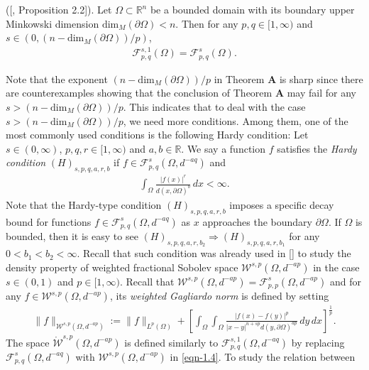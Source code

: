 \documentclass[11pt,twoside]{article}
\def\rr{{\mathbb R}}
\def\boz{{\Omega}}
\def\pa{\partial}                %
\theoremstyle{mylem}
\theoremstyle{definition}
\numberwithin{equation}{section}
\begin{document}
\medskip
{ ([\cite{c2000}, Proposition 2.2]).   Let \(\Omega\subset\mathbb{R}^n\) be a bounded domain 
with  its boundary upper Minkowski dimension $\mathrm{dim}_M(\partial\Omega)<n$. Then for any $ p,q\in[1,\infty)$ and $s\in (0,
{(n-\mathrm{dim}_M(\partial\Omega))}/{p})$,
\begin{align*}
\mathcal F_{p,q}^{s,1}(\boz)={\mathcal F}_{p,q}^{s}(\boz).
\end{align*}
}

Note that the exponent ${(n-\mathrm{dim}_M(\partial\Omega))}/{p}$ in Theorem {\bf A}
is sharp since there are counterexamples showing that 
the conclusion of Theorem {\bf A} may fail 
for any $s>{(n-\mathrm{dim}_M(\partial\Omega))}/{p}$. This indicates that to deal with the 
case $s>{(n-\mathrm{dim}_M(\partial\Omega))}/{p}$, we
need more conditions.
Among them, one of the most commonly used conditions is the following Hardy condition: 
Let $s\in(0,\infty)$, $p,q,r\in[1,\infty)$ and $a,b\in\rr$.
We say a function $f$ satisfies the 
\emph{Hardy condition} $(H)_{s,p,q,a,r,b}$
if $f\in \mathcal F_{p, q}^{s}(\boz,d^{-aq})$ and
\begin{align*}
\int_{\boz}  \frac{|f(x)|^r}{d (x, \pa\boz)^{b}}\,dx < \infty.
\end{align*}
Note that the Hardy-type condition $(H)_{s,p,q,a,r,b}$ imposes a specific decay bound for functions 
$f\in \mathcal{F}_{p,q}^{s}(\Omega,d^{-aq})$ as $x$ approaches the boundary $\partial\Omega$.
If $\Omega$ is bounded, then it is easy to see $(H)_{s,p,q,a,r,b_2}\Rightarrow (H)_{s,p,q,a,r,b_1}$
for any $0<b_1<b_2<\infty$.
Recall that such condition was already used in [\cite{dk2022}] to study the density property of weighted 
fractional Sobolev space $\mathcal W^{s,p}(\Omega,d^{-ap})$ in the 
case $s\in (0,1)$ and $p\in [1,\infty)$. 
Recall that $\mathcal W^{s,p}(\Omega,d^{-ap})=\mathcal F_{p, p}^{s}(\boz,d^{-ap})$ and for 
any $f\in \mathcal W^{s,p}(\Omega,d^{-ap})$, its 
\emph{weighted Gagliardo norm} is defined by setting
\begin{align*}
\|f\|_{\mathcal W^{s,p}(\Omega,d^{-ap})}:=\| f \|_{L^{p}(\Omega)} 
+\left[ \int_{\Omega} \int_{\Omega} 
\frac{\left| f(x)- f(y)\right|^p}
{|x - y|^{n+s p}d(y,\pa\boz)^{a p}}\,dy\,dx \right]^{\frac{1}{p}}.
\end{align*}
The space $\mathring{\mathcal{W}}^{s,p}(\boz,d^{-ap})$ is
defined similarly to $\mathcal F_{p,q}^{s,1}(\boz,d^{-aq})$ by replacing $\mathcal F_{p, q}^{s}
(\boz,d^{-aq})$ with $\mathcal{W}^{s,p}(\boz,d^{-ap})$ in \eqref{eqn-1.4}. To study the relation between
\end{document}
